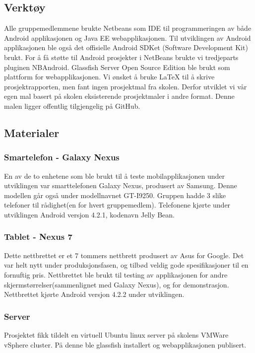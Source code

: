 \documentclass[../main.tex]{subfiles}
\begin{document}
\subsection{Verktøy}
Alle gruppemedlemmene brukte Netbeans som IDE til programmeringen av både Android applikasjonen og Java EE webapplikasjonen. Til utviklingen av Android applikasjonen ble også det offisielle Android SDKet (Software Development Kit) brukt. For å få støtte til Android prosjekter i NetBeans brukte vi tredjeparts pluginen NBAndroid. Glassfish Server Open Source Edition ble brukt som plattform for webapplikasjonen.\newline
\newline
Vi ønsket å bruke LaTeX til å skrive prosjektrapporten, men fant ingen prosjektmal fra skolen. Derfor utviklet vi vår egen mal basert på skolen eksisterende prosjektmaler i andre format. Denne malen ligger offentlig tilgjengelig på GitHub.

\subsection{Materialer}
\subsubsection{Smartelefon - Galaxy Nexus}
En av de to enhetene som ble brukt til å teste mobilapplikasjonen under utviklingen var smarttelefonen Galaxy Nexus, produsert av Samsung. Denne modellen går også under modellnavnet GT-I9250. Gruppen hadde 3 slike telefoner til rådighet(en for hvert gruppemedlem). Telefonene kjørte under utviklingen Android versjon 4.2.1, kodenavn Jelly Bean.
\subsubsection{Tablet - Nexus 7}
Dette nettbrettet er et 7 tommers nettbrett produsert av Asus for Google. Det var helt nytt under produksjonsfasen, og tilbød veldig gode spesifikasjoner til en fornuftig pris. Nettbrettet ble brukt til testing av applikasjonen for andre skjermstørrelser(sammenlignet med Galaxy Nexus), og for demonstrasjon. Nettbrettet kjørte Android versjon 4.2.2 under utviklingen.

\subsubsection{Server}
Prosjektet fikk tildelt en virtuell Ubuntu linux server på skolens VMWare vSphere cluster. På denne ble glassfish installert og webapplikasjonen publisert.
\end{document}
